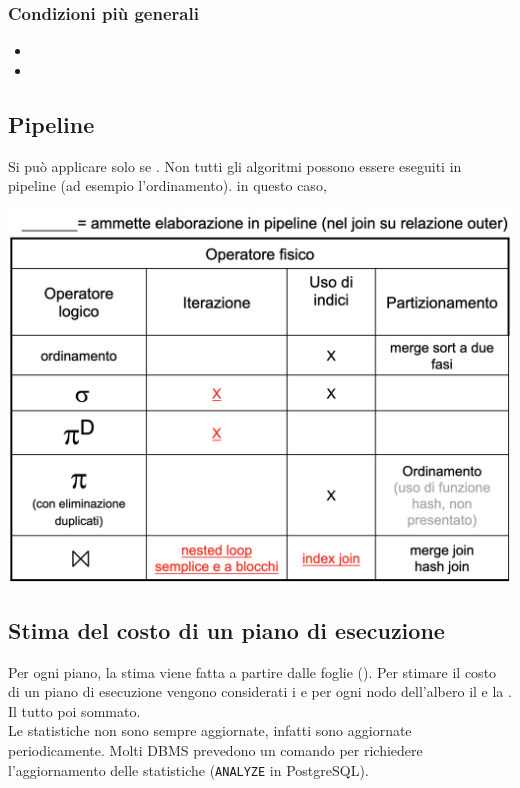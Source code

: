 \documentclass[12pt, a4paper]{report}
\begin{document}
    \subsubsection{Condizioni più generali}
    \begin{itemize}
        \item {}
        \item {}
    \end{itemize}
    \subsection{Pipeline}
    Si può applicare solo se . Non tutti gli algoritmi possono essere eseguiti in pipeline (ad esempio l'ordinamento).
    in questo caso, 
    \begin{center}
        \includegraphics[scale=0.4]{Appunti Latex/Immagini/pipeliningOpFisici.png}
    \end{center}
    \subsection{Stima del costo di un piano di esecuzione}
    Per ogni piano, la stima viene fatta a partire dalle foglie (). Per stimare il costo di un piano di esecuzione vengono considerati i  e per ogni nodo dell'albero il  e la . Il tutto poi sommato.\\
    Le statistiche non sono sempre aggiornate, infatti sono aggiornate periodicamente. Molti DBMS prevedono un comando per richiedere l'aggiornamento delle statistiche (\texttt{ANALYZE} in PostgreSQL).
\end{document}
